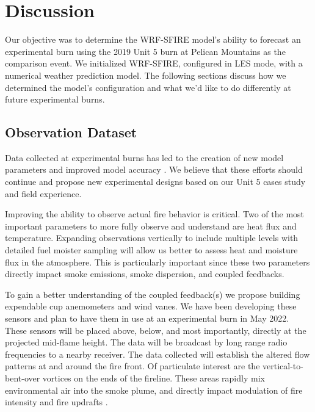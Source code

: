 \documentclass[preprints,article,accept,moreauthors,pdftex]{Definitions/mdpi}
\begin{document}
\section{Discussion}

Our objective was to determine the WRF-SFIRE model’s ability to forecast an experimental burn using the 2019 Unit 5 burn at Pelican Mountains as the comparison event. We initialized WRF-SFIRE, configured in LES mode, with a numerical weather prediction model. The following sections discuss how we determined the model’s configuration and what we’d like to do differently at future experimental burns.

\subsection{Observation Dataset}

Data collected at experimental burns has led to the creation of new model parameters and improved model accuracy \cite{kochanski_experimental_2018,mallia_incorporating_2020,moisseeva_capturing_2019,kochanski_evaluation_2013,coen_requirements_2018}. We believe that these efforts should continue and propose new experimental designs based on our Unit 5 cases study and field experience.

Improving the ability to observe actual fire behavior is critical. Two of the most important parameters to more fully observe and understand are heat flux and temperature. Expanding observations vertically to include multiple levels with detailed fuel moister sampling will allow us better to assess heat and moisture flux in the atmosphere. This is particularly important since these two parameters directly impact smoke emissions, smoke dispersion, and coupled feedbacks.

To gain a better understanding of the coupled feedback(s) we propose building expendable cup anemometers and wind vanes. We have been developing these sensors and plan to have them in use at an experimental burn in May 2022. These sensors will be placed above, below, and most importantly, directly at the projected mid-flame height. The data will be broadcast by long range radio frequencies to a nearby receiver. The data collected will establish the altered flow patterns at and around the fire front. Of particulate interest are the vertical-to-bent-over vortices on the ends of the fireline. These areas rapidly mix environmental air into the smoke plume, and directly impact modulation of fire intensity and fire updrafts \cite{moisseeva_capturing_2019,moisseeva_wildfire_2021,clements_fire_2016}.
\end{document}
